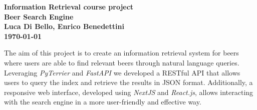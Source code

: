 \documentclass{article}
\begin{document}
\thispagestyle{plain}
\begin{center}
  \Large
  \textbf{Information Retrieval course project \\ Beer Search Engine} \\
  \vspace{0.4cm}
  \textbf{Luca Di Bello, Enrico Benedettini}
  \vspace{0.4cm}
  \textbf{\\ \today}
  \vspace{0.9cm}
\end{center}

\footnotesize

\noindent The aim of this project is to create an information retrieval system for beers where users are able to find relevant beers through natural language queries. Leveraging \textit{PyTerrier} and \textit{FastAPI} we developed a RESTful API that allows users to query the index and retrieve the results in JSON format. Additionally, a responsive web interface, developed using \textit{NextJS} and \textit{React.js}, allows interacting with the search engine in a more user-friendly and effective way.





\end{document}
